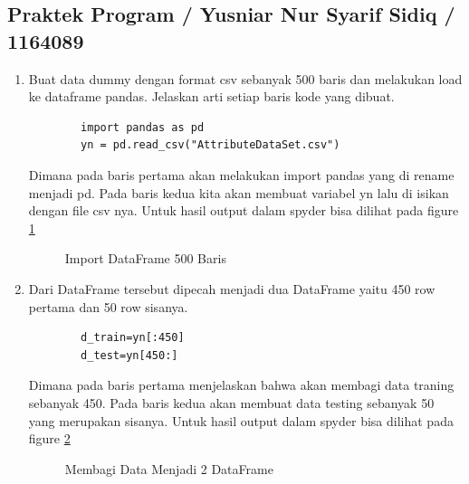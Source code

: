 \subsection{Praktek Program / Yusniar Nur Syarif Sidiq / 1164089}
\begin{enumerate}

\item Buat data dummy dengan format csv sebanyak 500 baris dan melakukan load ke dataframe pandas. Jelaskan arti setiap baris kode yang dibuat.

	\begin{verbatim}
		import pandas as pd
		yn = pd.read_csv("AttributeDataSet.csv")
	\end{verbatim}

Dimana pada baris pertama akan melakukan import pandas yang di rename menjadi pd. Pada baris kedua kita akan membuat variabel yn lalu di isikan dengan file csv nya. Untuk hasil output dalam spyder bisa dilihat pada figure \ref{YNC4-6}

	\begin{figure}[ht]
		\caption{Import DataFrame 500 Baris}
		\label{YNC4-6}
	\end{figure}

\item Dari DataFrame tersebut dipecah menjadi dua DataFrame yaitu 450 row pertama dan 50 row sisanya.

	\begin{verbatim}
		d_train=yn[:450]
		d_test=yn[450:]
	\end{verbatim}

Dimana pada baris pertama menjelaskan bahwa akan membagi data traning sebanyak 450. Pada baris kedua akan membuat data testing sebanyak 50 yang merupakan sisanya. Untuk hasil output dalam spyder bisa dilihat pada figure \ref{YNC4-7}

	\begin{figure}[ht]
		\caption{Membagi Data Menjadi 2 DataFrame}
		\label{YNC4-7}
	\end{figure}


\end{enumerate}
